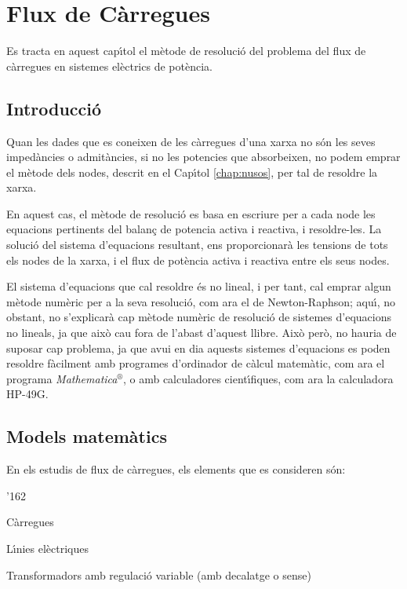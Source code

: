 \chapter{Flux de C\`{a}rregues}

Es tracta en aquest cap\'{\i}tol el m\`{e}tode de resoluci\'{o} del problema del flux de c\`{a}rregues en
sistemes el\`{e}ctrics de pot\`{e}ncia.

\section{Introducci\'{o}}

Quan les dades que es coneixen de les c\`{a}rregues d'una xarxa no s\'{o}n les seves imped\`{a}ncies o
admit\`{a}ncies, si no les potencies que absorbeixen, no podem emprar el m\`{e}tode dels nodes,
descrit en el Cap\'{\i}tol \ref{chap:nusos}, per tal de resoldre la xarxa.

En aquest cas, el m\`{e}tode de resoluci\'{o} es basa en escriure per a cada
node les equacions pertinents del balan\c{c} de potencia activa i
reactiva, i resoldre-les. La soluci\'{o} del sistema d'equacions
resultant, ens proporcionar\`{a} les tensions de tots els nodes de la
xarxa, i el flux de pot\`{e}ncia activa i reactiva entre els seus nodes.

El sistema d'equacions que cal resoldre \'{e}s no lineal, i per tant,
cal emprar algun m\`{e}tode num\`{e}ric per a la seva resoluci\'{o}, com ara el
de Newton-Raphson; aqu\'{\i}, no obstant, no
s'explicar\`{a} cap m\`{e}tode num\`{e}ric de resoluci\'{o} de sistemes d'equacions
no lineals, ja que aix\`{o} cau fora de l'abast d'aquest llibre. Aix\`{o}
per\`{o}, no hauria de suposar cap problema, ja que avui en dia aquests
sistemes d'equacions es poden resoldre f\`{a}cilment amb programes
d'ordinador de c\`{a}lcul matem\`{a}tic, com ara el programa
\textit{Mathematica}${}^\circledR$,
 o amb
calculadores cient\'{\i}fiques, com ara la calculadora \textsf{HP-49G}.

\section{Models matem\`{a}tics} 

En els estudis de flux de c\`{a}rregues, els elements que es consideren s\'{o}n:
\begin{dinglist}{'162}
   \item C\`{a}rregues
   \item L\'{\i}nies el\`{e}ctriques
   \item Transformadors amb regulaci\'{o} variable (amb decalatge o sense)
\end{dinglist}

